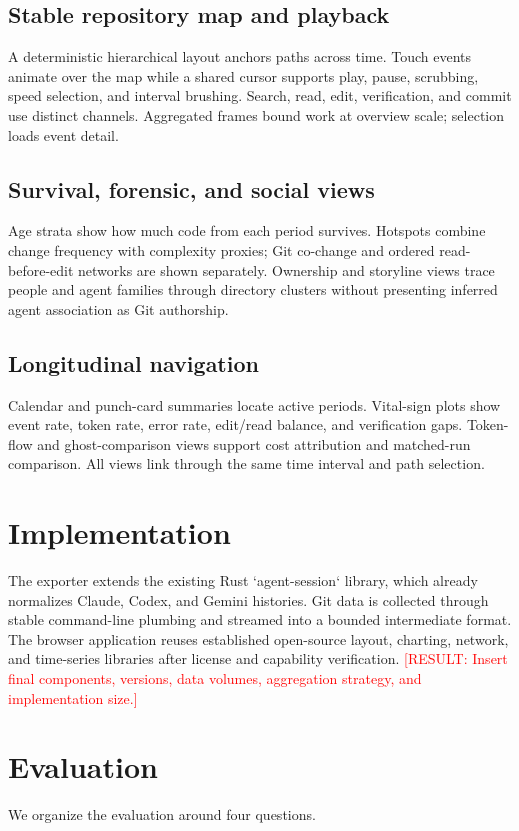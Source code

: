\documentclass[10pt,twocolumn]{article}
\newcommand{\result}[1]{\textcolor{red}{[RESULT: #1]}}
\begin{document}
\subsection{Stable repository map and playback}
A deterministic hierarchical layout anchors paths across time. Touch events
animate over the map while a shared cursor supports play, pause, scrubbing,
speed selection, and interval brushing. Search, read, edit, verification, and
commit use distinct channels. Aggregated frames bound work at overview scale;
selection loads event detail.

\subsection{Survival, forensic, and social views}
Age strata show how much code from each period survives. Hotspots combine
change frequency with complexity proxies; Git co-change and ordered
read-before-edit networks are shown separately. Ownership and storyline views
trace people and agent families through directory clusters without presenting
inferred agent association as Git authorship.

\subsection{Longitudinal navigation}
Calendar and punch-card summaries locate active periods. Vital-sign plots show
event rate, token rate, error rate, edit/read balance, and verification gaps.
Token-flow and ghost-comparison views support cost attribution and matched-run
comparison. All views link through the same time interval and path selection.

\section{Implementation}
The exporter extends the existing Rust `agent-session` library, which already
normalizes Claude, Codex, and Gemini histories. Git data is collected through
stable command-line plumbing and streamed into a bounded intermediate format.
The browser application reuses established open-source layout, charting,
network, and time-series libraries after license and capability verification.
\result{Insert final components, versions, data volumes, aggregation strategy,
and implementation size.}

\section{Evaluation}
We organize the evaluation around four questions.
\end{document}
